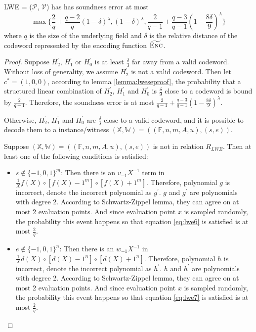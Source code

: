 \begin{lemma}
\label{lemma:lwese}

LWE = ($\mathcal{P}$, $\mathcal{V}$) has has soundness error at most 
$$
    \max
    \biggl\{
    \frac{2}{q} + \frac{q-2}{q}(1 - \delta)^\lambda, 
    (1 - \delta)^\lambda, 
    \frac{2}{q-1} + \frac{q-3}{q-1}(1 - \frac{8\delta}{9})^\lambda
    \biggr\}
$$
where $q$ is the size of the underlying field and $\delta$ is the relative distance of the codeword represented by the encoding function $\widetilde{\textsc{Enc}}$.

\end{lemma}
\begin{proof}

Suppose $H_2^\prime$, $H_1^\prime$ or $H_0^\prime$ is at least $\frac{\delta}{3}$ far away from a valid codeword. Without loss of generality, we assume $H_2^\prime$ is not a valid codeword. Then let $c^* = (1, 0, 0)$, according to lemma \ref{lemma:lweseproof}, the probability that a structured linear combination of $H_2^\prime$, $H_1^\prime$ and $H_0^\prime$ is $\frac{\delta}{9}$ close to a codeword is bound by $\frac{2}{q-1}$. Therefore, the soundness error is at most $\frac{2}{q-1} + \frac{q-3}{q-1}(1 - \frac{8\delta}{9})^\lambda$.

Otherwise, $H_2^\prime$, $H_1^\prime$ and $H_0^\prime$ are $\frac{\delta}{3}$ close to a valid codeword, and it is possible to decode them to a instance/witness $(\mathbb{X}, \mathbb{W}) = ((\mathbb{F}, n, m, A, u), (s, e))$. 

Suppose $(\mathbb{X}, \mathbb{W}) = ((\mathbb{F}, n, m, A, u), (s, e))$ is not in relation $R_{LWE}$. Then at least one of the following conditions is satisfied:
\begin{itemize}
    \item $s \notin \{-1, 0, 1\}^{m}$: Then there is an $v_{-1} X^{-1}$ term in $\frac{1}{X} f(X) \circ [f(X) - 1^m] \circ [f(X) + 1^m]$. Therefore, polynomial $g$ is incorrect, denote the incorrect polynomial as $g^\prime$. $g$ and $g^\prime$ are polynomials with degree 2. According to Schwartz-Zippel lemma, they can agree on at most 2 evaluation points. And since evaluation point $x$ is sampled randomly, the probability this event happens so that equation \ref{eq:lwe6} is satisfied is at most $\frac{2}{q}$. 
    
    \item $e \notin \{-1, 0, 1\}^{n}$: Then there is an $w_{-1} X^{-1}$ in $\frac{1}{X} d(X) \circ [d(X) - 1^n] \circ [d(X) + 1^n]$. Therefore, polynomial $h$ is incorrect, denote the incorrect polynomial as $h^\prime$. $h$ and $h^\prime$ are polynomials with degree 2. According to Schwartz-Zippel lemma, they can agree on at most 2 evaluation points. And since evaluation point $x$ is sampled randomly, the probability this event happens so that equation \ref{eq:lwe7} is satisfied is at most $\frac{2}{q}$. 
    

\end{itemize}
\end{proof}
